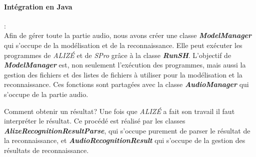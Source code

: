 \paragraph*{Intégration en Java} : \\
Afin de gérer toute la partie audio, nous avons créer une classe \textbf{\textit{ModelManager}} qui s'occupe de la modélisation et de la reconnaissance. Elle
peut exécuter les programmes de \textit{ALIZÉ} et de \textit{SPro} grâce à la classe \textbf{\textit{RunSH}}. L'objectif de \textbf{\textit{ModelManager}}
est, non seulement l'exécution des programmes, mais aussi la gestion des fichiers et des listes de fichiers à utiliser pour la modélisation et la
reconnaissance.
Ces fonctions sont partagées avec la classe \textbf{\textit{AudioManager}} qui s'occupe de la partie audio.

Comment obtenir un résultat? Une fois que \textit{ALIZÉ} a fait son travail il faut interpréter le résultat. Ce procédé est réalisé par les classes
\textbf{\textit{AlizeRecognitionResultParse}}, qui s'occupe purement de parser le résultat de la reconnaissance, et \textbf{\textit{AudioRecognitionResult}}
qui s'occupe de la gestion des résultats de reconnaissance.



